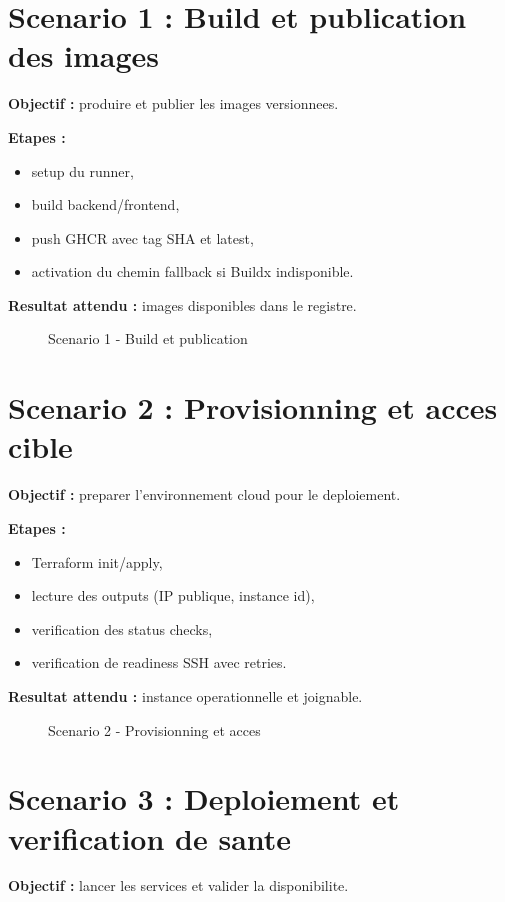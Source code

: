 \documentclass[12pt,a4paper]{report}
\begin{document}
\section{Scenario 1 : Build et publication des images}
\textbf{Objectif :} produire et publier les images versionnees.

\textbf{Etapes :}
\begin{itemize}
  \item setup du runner,
  \item build backend/frontend,
  \item push GHCR avec tag SHA et latest,
  \item activation du chemin fallback si Buildx indisponible.
\end{itemize}

\textbf{Resultat attendu :} images disponibles dans le registre.

\begin{figure}[H]
  \centering
  \caption{Scenario 1 - Build et publication}
\end{figure}

\section{Scenario 2 : Provisionning et acces cible}
\textbf{Objectif :} preparer l'environnement cloud pour le deploiement.

\textbf{Etapes :}
\begin{itemize}
  \item Terraform init/apply,
  \item lecture des outputs (IP publique, instance id),
  \item verification des status checks,
  \item verification de readiness SSH avec retries.
\end{itemize}

\textbf{Resultat attendu :} instance operationnelle et joignable.

\begin{figure}[H]
  \centering
  \caption{Scenario 2 - Provisionning et acces}
\end{figure}

\section{Scenario 3 : Deploiement et verification de sante}
\textbf{Objectif :} lancer les services et valider la disponibilite.
\end{document}
